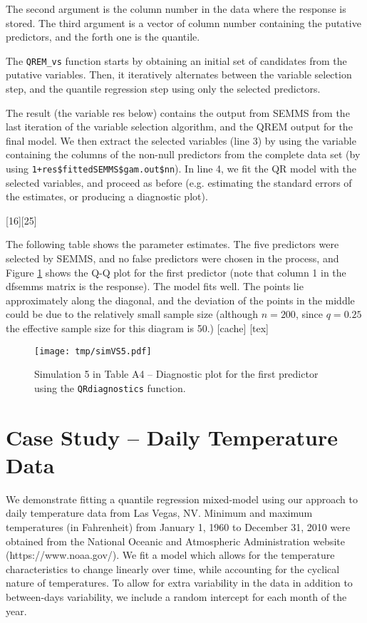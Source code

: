 \documentclass[a4paper,10pt]{article}
\begin{document}
The second argument is the column number in the data where the response is stored. The third argument is a vector of column number containing the putative predictors, and the forth one is the quantile.

The \texttt{QREM\_vs} function starts by obtaining an initial set of candidates from the putative variables. Then, it iteratively alternates between the variable selection step, and the quantile regression step using only the selected predictors.

The result (the variable res below) contains the output from SEMMS from the last iteration of the variable selection  algorithm, and the QREM output for the final model. We then extract the selected variables (line 3) by using the variable containing the columns of the non-null predictors from the complete data set (by using \texttt{1+res\$fittedSEMMS\$gam.out\$nn}).
In line 4, we fit the QR model with the selected variables, and proceed as before (e.g. estimating the standard errors of the estimates, or producing a diagnostic plot).

[16][25]

The following table shows the parameter estimates. The five predictors were selected by SEMMS, and no false predictors were chosen in the process, and Figure \ref{sim5vsqq} shows the Q-Q plot for the first predictor (note that column 1 in the dfsemms matrix is the response). The model fits well. The points lie approximately along the diagonal, and the deviation of the points in the middle could be due to the relatively small sample size (although $n=200$, since $q=0.25$ the effective sample size for this diagram is 50.)
[cache]
 [tex]	

\begin{figure}[b!]
\centering
\texttt{[image: tmp/simVS5.pdf]}
\caption{Simulation 5 in Table A4 -- Diagnostic plot for the first predictor using the \texttt{QRdiagnostics} function.}\label{sim5vsqq}
\end{figure}
     
\section{Case Study -- Daily Temperature Data}
We demonstrate fitting a quantile regression mixed-model using our approach to daily temperature data from Las Vegas, NV. Minimum and maximum temperatures (in Fahrenheit) from January 1, 1960 to December 31, 2010 were obtained from the National Oceanic and Atmospheric Administration website (https://www.noaa.gov/).
We fit a  model which allows for the temperature characteristics to change linearly over time, while accounting for the cyclical nature of temperatures. To allow for extra variability in the data in addition to between-days variability, we include a random intercept for each month of the year.
\end{document}
